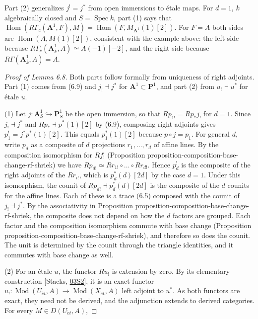 \documentclass[11pt]{article}
\providecommand{\Hom}{}\renewcommand{\Hom}{\operatorname{Hom}}
\begin{document}
\label{bp27}%
Part (2) generalizes \(j^!=j^*\) from open immersions to étale maps. For \(d=1\), \(k\) algebraically closed and \(S=\operatorname{Spec}k\), part (1) says that \(\Hom(R\Gamma_c(\mathbf A^1,F),M)=\Hom(F,M_{\mathbf A^1}(1)[2])\). For \(F=A\) both sides are \(\Hom(A,M(1)[2])\), consistent with the example above: the left side because \(R\Gamma_c(\mathbf A^1_{\bar k},A)\simeq A(-1)[-2]\), and the right side because \(R\Gamma(\mathbf A^1_{\bar k},A)=A\).

\begin{proof}[{Proof of Lemma 6.8}]\label{bp28}%
Both parts follow formally from uniqueness of right adjoints. Part (1) comes from (6.9) and \(j_!\dashv j^*\) for \(\mathbf A^1\subset\mathbf P^1\), and part (2) from \(u_!\dashv u^*\) for étale \(u\).

(1) Let \(j:\mathbf A^1_S\hookrightarrow\mathbf P^1_S\) be the open immersion, so that \(Rp_{1!}=Rp_*j_!\) for \(d=1\). Since \(j_!\dashv j^*\) and \(Rp_*\dashv p^*(1)[2]\) by (6.9), composing right adjoints gives \(p_1^!=j^*p^*(1)[2]\). This equals \(p_1^*(1)[2]\) because \(p\circ j=p_1\). For general \(d\), write \(p_d\) as a composite of \(d\) projections \(r_1,\dots,r_d\) of affine lines. By the composition isomorphism for \(Rf_!\) (Proposition proposition-composition-base-change-rf-shriek) we have \(Rp_{d!}\simeq Rr_{1!}\circ\dots\circ Rr_{d!}\). Hence \(p_d^!\) is the composite of the right adjoints of the \(Rr_{i!}\), which is \(p_d^*(d)[2d]\) by the case \(d=1\). Under this isomorphism, the counit of \(Rp_{d!}\dashv p_d^*(d)[2d]\) is the composite of the \(d\) counits for the affine lines. Each of these is a trace (6.5) composed with the counit of \(j_!\dashv j^*\). By the associativity in Proposition proposition-composition-base-change-rf-shriek, the composite does not depend on how the \(d\) factors are grouped. Each factor and the composition isomorphism commute with base change (Proposition proposition-composition-base-change-rf-shriek), and therefore so does the counit. The unit is determined by the counit through the triangle identities, and it commutes with base change as well.

(2) For an étale \(u\), the functor \(Ru_!\) is extension by zero. By its elementary construction [Stacks, \href{https://stacks.math.columbia.edu/tag/03S2}{03S2}], it is an exact functor \(u_!:\operatorname{Mod}(U_{\acute{e}t},A)\to\operatorname{Mod}(X_{\acute{e}t},A)\) left adjoint to \(u^*\). As both functors are exact, they need not be derived, and the adjunction extends to derived categories. For every \(M\in D(U_{\acute{e}t},A)\),


\end{proof}
\end{document}
